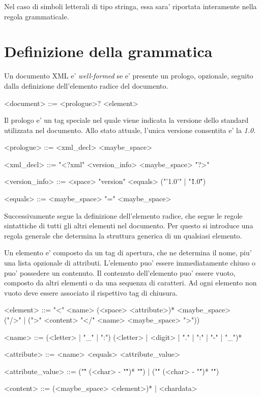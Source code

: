 \documentclass[italian,a4paper]{article}
\begin{document}
Nel caso di simboli letterali di tipo stringa, essa sara' riportata interamente
nella regola grammaticale.

\section{Definizione della grammatica}

Un documento XML e' \emph{well-formed} se e' presente un prologo, opzionale,
seguito dalla definizione dell'elemento radice del documento.

\begin{grammar}
	<document> ::= <prologue>? <element>
\end{grammar}

Il prologo e' un tag speciale nel quale viene indicata la versione dello
standard utilizzata nel documento. Allo stato attuale, l'unica versione
consentita e' la \emph{1.0}.

\begin{grammar}
	<prologue> ::= <xml\_decl> <maybe\_space>

	<xml\_decl> ::= "<?xml" <version\_info> <maybe\_space> "?>"

	<version\_info> ::= <space> "version" <equals> ("'1.0'" | "\"1.0\"")

	<equals> ::= <maybe\_space> "=" <maybe\_space>
\end{grammar}

Successivamente segue la definizione dell'elemento radice, che segue le regole
sintattiche di tutti gli altri elementi nel documento. Per questo si introduce
una regola generale che determina la struttura generica di un qualsiasi
elemento.

Un elemento e' composto da un tag di apertura, che ne determina il nome, piu'
una lista opzionale di attributi. L'elemento puo' essere immediatamente chiuso
o puo' possedere un contenuto. Il contenuto dell'elemento puo' essere vuoto,
composto da altri elementi o da una sequenza di caratteri. Ad ogni elemento non
vuoto deve essere associato il rispettivo tag di chiusura.

\begin{grammar}
	<element> ::= "<" <name> (<space> <attribute>)* <maybe\_space> \\
	("/>" | (">" <content> "</" <name> <maybe\_space> ">"))

	<name> ::= (<letter> | "\_" | ":") (<letter> | <digit> | "." | ":" | "-" | "\_")*

	<attribute> ::= <name> <equals> <attribute\_value>

	<attribute\_value> ::= ("\"" (<char> - "\"")* "\"") | ("\'" (<char> - "\'")* "\'")

	<content> ::= (<maybe\_space> <element>)* | <chardata>
\end{grammar}
\end{document}

